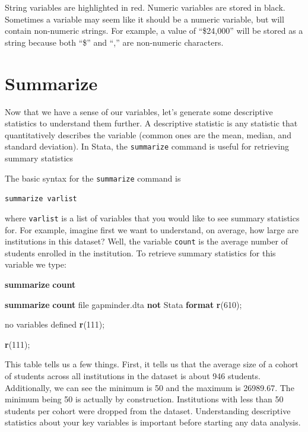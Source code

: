 \documentclass[
]{book}
\newenvironment{Shaded}{\begin{snugshade}}{\end{snugshade}}
\newcommand{\FunctionTok}[1]{\textcolor[rgb]{0.13,0.29,0.53}{\textbf{#1}}}
\newcommand{\KeywordTok}[1]{\textcolor[rgb]{0.13,0.29,0.53}{\textbf{#1}}}
\newcommand{\NormalTok}[1]{#1}
\begin{document}
String variables are highlighted in red. Numeric variables are stored in black. Sometimes a variable may seem like it should be a numeric variable, but will contain non-numeric strings. For example, a value of ``\$24,000'' will be stored as a string because both ``\$'' and ``,'' are non-numeric characters.

\section{Summarize}\label{summarize}

Now that we have a sense of our variables, let's generate some descriptive statistics to understand them further. A descriptive statistic is any statistic that quantitatively describes the variable (common ones are the mean, median, and standard deviation). In Stata, the \texttt{summarize} command is useful for retrieving summary statistics

The basic syntax for the \texttt{summarize} command is

\texttt{summarize\ varlist}

where \texttt{varlist} is a list of variables that you would like to see summary statistics for. For example, imagine first we want to understand, on average, how large are institutions in this dataset? Well, the variable \texttt{count} is the average number of students enrolled in the institution. To retrieve summary statistics for this variable we type:

\begin{Shaded}
\begin{Highlighting}[]
\KeywordTok{summarize} \FunctionTok{count}
\end{Highlighting}
\end{Shaded}

\begin{Shaded}
\begin{Highlighting}[]
\KeywordTok{summarize} \FunctionTok{count}
\NormalTok{file gapminder.dta }\KeywordTok{not}\NormalTok{ Stata }\KeywordTok{format}
\FunctionTok{r}\NormalTok{(610);}


\NormalTok{no variables defined}
\FunctionTok{r}\NormalTok{(111);}

\FunctionTok{r}\NormalTok{(111);}
\end{Highlighting}
\end{Shaded}

This table tells us a few things. First, it tells us that the average size of a cohort of students across all institutions in the dataset is about 946 students. Additionally, we can see the minimum is 50 and the maximum is 26989.67. The minimum being 50 is actually by construction. Institutions with less than 50 students per cohort were dropped from the dataset. Understanding descriptive statistics about your key variables is important before starting any data analysis.
\end{document}
